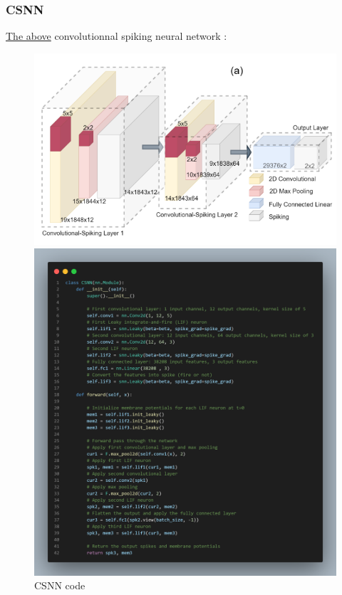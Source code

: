 \documentclass[11pt]{article}
\begin{document}
\subsubsection*{CSNN}

\hyperref[fig:csnn_template]{The above} convolutionnal spiking neural network :

\begin{figure}[H]
  \begin{minipage}{0.4\textwidth}
    \centering
    \includegraphics[width=0.9\linewidth]{image/csnn_template_model.png}
  \end{minipage}
  \begin{minipage}{0.6\textwidth}
    \centering
    \includegraphics[width=\textwidth]{./image/csnn_code.png}    \caption{CSNN code}
    \label{fig:csnn_code}
    
  \end{minipage}
\end{figure}
\end{document}

